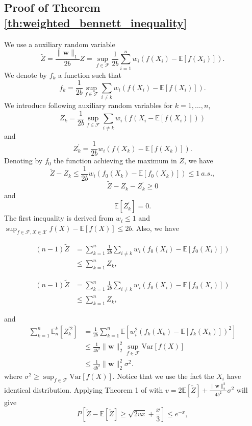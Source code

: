 \documentclass[letterpaper]{article} %
\def\DoubleColumn{}
\def\DoubleColumnEnd{}
\def\SingleColumn{}
\def\SingleColumnEnd{}
\newcommand{\E}{\mathbb{E}}
\newcommand{\Pro}{P}
\newcommand{\Var}{\text{Var}}
\newcommand{\weight}{\mathbf{w}}
\newcommand{\normo}[1]{\|#1\|_1}
\begin{document}
\subsection{Proof of Theorem \ref{th:weighted_bennett_inequality}} %
\label{sub:proof_of_theorem_th:weighted_bennett_inequality}

    We use a auxiliary random variable
    \[\widetilde{Z}=\frac{\normo{\weight{}}}{2b}Z=\sup_{f\in\mathcal{F}}\frac{1}{2b}\sum_{i=1}^nw_i\allowbreak(f(X_i)-\E[f(X_i)]).\]
    We denote by $f_k$ a function such that
    \[f_k = \frac{1}{2b}\sup_{f\in\mathcal F} \sum_{i\neq k}w_i(f(X_i)-\E[f(X_i)]).\]
    We introduce following auxiliary random variables for $k=1,\dots,n$,
    \[Z_k = \frac{1}{2b}\sup_{f\in\mathcal F} \sum_{i\neq k}w_i(f(X_i-\E[f(X_i)]))\]
    and
    \[Z_k^\prime = \frac{1}{2b}w_i(f(X_k)-\E[f(X_k)]).\]
    Denoting by $f_0$ the function achieving the maximum in $Z$, we have
    \[\widetilde{Z}-Z_k\le \frac{1}{2b}w_i(f_0(X_k)-\E[f_0(X_k)])\le 1\ a.s.,\]
    \[\widetilde{Z}-Z_k-Z_k^\prime\ge 0\]
    and
    \[\E[Z_k^\prime] = 0.\]
    The first inequality is derived from $w_i\le 1$ and $\sup_{f\in\mathcal{F}, X\in\mathcal{X}} f(X)-\E[f(X)]\le 2b$.
    Also, we have
    \DoubleColumn
    \begin{align*}
        (n-1)\widetilde{Z} &= \sum_{k=1}^n\frac{1}{2b}\sum_{i\neq k}w_i(f_0(X_i)-\E[f_0(X_i)])\\
        &\le \sum_{k=1}^n Z_k,
    \end{align*}
    \DoubleColumnEnd
    \SingleColumn
    \begin{align*}
        (n-1)\widetilde{Z} &= \sum_{k=1}^n\frac{1}{2b}\sum_{i\neq k}w_i(f_0(X_i)-\E[f_0(X_i)])\\
        &\le \sum_{k=1}^n Z_k,
    \end{align*}
    \SingleColumnEnd
    and
    \begin{align*}
        \sum_{k=1}^n \E_n^k[Z_k^{\prime2}] &= \frac{1}{2b}\sum_{k=1}^n \E[w_i^2(f_k(X_k)-\E[f_k(X_k)])^2]\\
        &\le \frac{1}{4b^2}\|\weight{}\|_2^2\sup_{f\in\mathcal F}\Var[f(X)]\\
        &\le \frac{1}{4b^2}\|\weight{}\|_2^2\sigma^2.
    \end{align*}
    where $\sigma^2\ge \sup_{f\in\mathcal F}\Var[f(X)]$.
    Notice that we use the fact the $X_i$ have identical distribution.
    Applying Theorem 1 of \cite{Bousquet2002a} with $v=2\E[\widetilde{Z}]+\frac{\|\weight{}\|_2^2}{4b^2}\sigma^2$ will give
    \[\Pro[\widetilde{Z}-\E[\widetilde{Z}]\ge \sqrt{2vx}+\frac{x}{3}]\le e^{-x},\]
\end{document}
